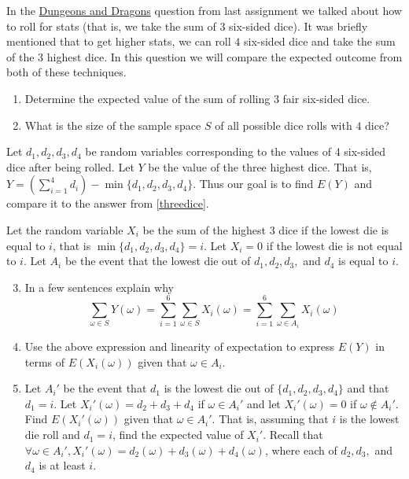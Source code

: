 \documentclass[12pt]{article}
\newcounter{ques}
\newenvironment{question}{\stepcounter{ques}{\noindent\bf Question \arabic{ques}:}}{\vspace{5mm}}
\begin{document}
\begin{question}
	In the \href{https://dnd.wizards.com/}{Dungeons and Dragons} question from last assignment we talked about how to roll for stats (that is, we take the sum of $3$ six-sided dice). It was briefly mentioned that to get higher stats, we can roll $4$ six-sided dice and take the sum of the $3$ highest dice. In this question we will compare the expected outcome from both of these techniques.
	\begin{enumerate}
		\item\label{threedice} Determine the expected value of the sum of rolling $3$ fair six-sided dice.
		\item What is the size of the sample space $S$ of all possible dice rolls with $4$ dice?
	\end{enumerate}

		Let $d_1,d_2,d_3,d_4$ be random variables corresponding to the values of $4$ six-sided dice after being rolled. Let $Y$ be the value of the three highest dice. That is, $Y =\left(\sum_{i=1}^4 d_i \right)- \min\{d_1,d_2,d_3,d_4\}$. Thus our goal is to find $E(Y)$ and compare it to the answer from \ref{threedice}.
		
		Let the random variable $X_i$ be the sum of the highest $3$ dice if the lowest die is equal to $i$, that is $\min\{d_1,d_2,d_3,d_4\}=i$.  Let $X_i =0$ if the lowest die is not equal to $i$.  Let $A_i$ be the event that the lowest die out of $d_1,d_2,d_3,$ and $d_4$ is equal to $i$. 
	\begin{enumerate}\setcounter{enumi}{2}	
		\item In a few sentences explain why $$\sum_{\omega \in S} Y(\omega)= \sum_{i=1}^6 \sum_{\omega \in S} X_i(\omega) = \sum_{i=1}^6 \sum_{\omega \in A_i} X_i(\omega)$$
		
		
		\item Use the above expression and linearity of expectation to express $E(Y)$ in terms of $E(X_i(\omega))$ given that $\omega \in A_i$. 
		
	
		
		
		\item Let $A_i'$ be the event that $d_1$ is the lowest die out of $\{d_1,d_2,d_3,d_4\}$ and that $d_1 = i$. Let  $X_i'(\omega)=d_2+d_3+d_4$ if $\omega \in A_i'$ and let $X_i'(\omega)=0$ if $\omega \notin A_i'$. Find  $E(X_i'(\omega))$ given that $\omega \in A_i'$. That is, assuming that $i$ is the lowest die roll and $d_1 = i$, find the expected value of $X_i'$. Recall that $\forall \omega \in A_i', X_i'(\omega) = d_2(\omega)+d_3(\omega)+d_4(\omega)$, where each of $d_2,d_3,$ and $d_4$ is at least $i$.
	

\end{enumerate}
\end{question}
\end{document}
